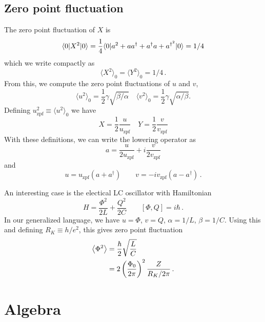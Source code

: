 \subsection{Zero point fluctuation}

The zero point fluctuation of $X$ is
\begin{equation}
\langle 0 | X^2 | 0 \rangle = \frac{1}{4}\langle 0 | a^2 + aa^{\dagger} + a^{\dagger}a + a^{\dagger^2} | 0 \rangle = 1/4
\end{equation}
which we write compactly as
\begin{equation}
\langle X^2 \rangle_0 = \langle Y^2 \rangle_0 = 1/4 \, .
\end{equation}
From this, we compute the zero point fluctuations of $u$ and $v$, \begin{equation}
\langle u^2 \rangle_0 = \frac{1}{2}\gamma \sqrt{\beta / \alpha} \quad \langle v^2 \rangle_0 = \frac{1}{2}\gamma \sqrt{\alpha / \beta} . \end{equation}
Defining $u_{\textrm{zpf}}^2 \equiv \langle u^2 \rangle_0 $ we have \begin{equation}
X = \frac{1}{2}\frac{u}{u_{\textrm{zpf}}} \quad Y = \frac{1}{2}\frac{v}{v_{\textrm{zpf}}} \end{equation}
With these definitions, we can write the lowering operator as
\begin{equation}
a = \frac{u}{2 u_\text{zpf}} + i \frac{v}{2 v_\text{zpf}}
\end{equation}
and
\begin{equation}
  u = u_\text{zpf}(a + a^\dagger) \qquad v = -i v_\text{zpf} (a - a^\dagger) \, .
\end{equation}

An interesting case is the electical LC oscillator with Hamiltonian
\begin{equation*}
  H = \frac{\Phi^2}{2L} + \frac{Q^2}{2C} \qquad [\Phi, Q] = i \hbar \, .
\end{equation*}
In our generalized language, we have $u = \Phi$, $v=Q$, $\alpha=1/L$, $\beta = 1/C$.
Using this and defining $R_K \equiv h/e^2$, this gives zero point fluctuation
\begin{align*}
  \left \langle \Phi^2 \right \rangle
  &= \frac{\hbar}{2} \sqrt{\frac{L}{C}} \\
  &= 2 \left( \frac{\Phi_0}{2\pi} \right)^2 \frac{Z}{R_K/2\pi} \, .
\end{align*}

\section{Algebra}

